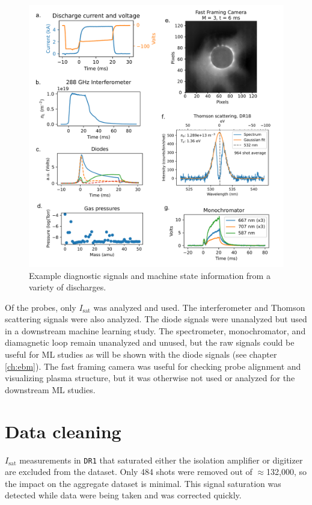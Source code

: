 \begin{figure}
	\centering
	\includegraphics[width=450pt]{figures/diagnostics-examples.pdf}
	\caption[Example machine state information and diagnostic signals]{\label{fig:example-diagnostics-msi}Example diagnostic signals and machine state information from a variety of discharges.}
\end{figure}

Of the probes, only $I_\text{sat}$ was analyzed and used. The interferometer and Thomson scattering signals were also analyzed. The diode signals were unanalyzed but used in a downstream machine learning study. The spectrometer, monochromator, and diamagnetic loop remain unanalyzed and unused, but the raw signals could be useful for ML studies as will be shown with the diode signals (see chapter \ref{ch:ebm}). The fast framing camera was useful for checking probe alignment and visualizing plasma structure, but it was otherwise not used or analyzed for the downstream ML studies.

\section{Data cleaning}

$I_\text{sat}$ measurements in \texttt{DR1} that saturated either the isolation amplifier or digitizer are excluded from the dataset. Only 484 shots were removed out of $\approx$132,000, so the impact on the aggregate dataset is minimal. This signal saturation was detected while data were being taken and was corrected quickly.


